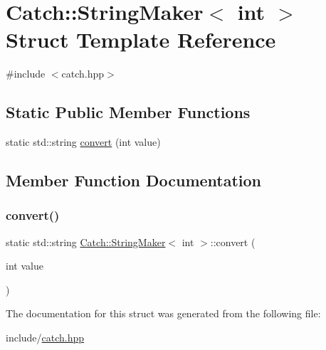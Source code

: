 \hypertarget{structCatch_1_1StringMaker_3_01int_01_4}{}\section{Catch\+:\+:String\+Maker$<$ int $>$ Struct Template Reference}
\label{structCatch_1_1StringMaker_3_01int_01_4}


{\ttfamily \#include $<$catch.\+hpp$>$}

\subsection*{Static Public Member Functions}
\begin{DoxyCompactItemize}
\item 
static std\+::string \mbox{\hyperlink{structCatch_1_1StringMaker_3_01int_01_4_aab096e55fb7283f6ad47b5ca277e22e8}{convert}} (int value)
\end{DoxyCompactItemize}


\subsection{Member Function Documentation}
\mbox{\label{structCatch_1_1StringMaker_3_01int_01_4_aab096e55fb7283f6ad47b5ca277e22e8}} 
\subsubsection{\texorpdfstring{convert()}{convert()}}
{\footnotesize\ttfamily static std\+::string \mbox{\hyperlink{structCatch_1_1StringMaker}{Catch\+::\+String\+Maker}}$<$ int $>$\+::convert (\begin{DoxyParamCaption}\item[{int}]{value }\end{DoxyParamCaption})\hspace{0.3cm}{\ttfamily [static]}}



The documentation for this struct was generated from the following file\+:\begin{DoxyCompactItemize}
\item 
include/\mbox{\hyperlink{catch_8hpp}{catch.\+hpp}}\end{DoxyCompactItemize}
